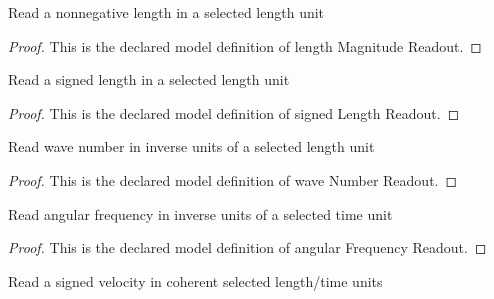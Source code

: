 \begin{definition}
  \label{def:physics:phyx-mini-0302:phyxminiproblems-problemphyxmini0302-lengthmagnitudereadout}
  Read a nonnegative length in a selected length unit
\end{definition}
\begin{proof}
  This is the declared model definition of length Magnitude Readout.
\end{proof}
\begin{definition}
  \label{def:physics:phyx-mini-0302:phyxminiproblems-problemphyxmini0302-signedlengthreadout}
  Read a signed length in a selected length unit
\end{definition}
\begin{proof}
  This is the declared model definition of signed Length Readout.
\end{proof}
\begin{definition}
  \label{def:physics:phyx-mini-0302:phyxminiproblems-problemphyxmini0302-wavenumberreadout}
  Read wave number in inverse units of a selected length unit
\end{definition}
\begin{proof}
  This is the declared model definition of wave Number Readout.
\end{proof}
\begin{definition}
  \label{def:physics:phyx-mini-0302:phyxminiproblems-problemphyxmini0302-angularfrequencyreadout}
  Read angular frequency in inverse units of a selected time unit
\end{definition}
\begin{proof}
  This is the declared model definition of angular Frequency Readout.
\end{proof}
\begin{definition}
  \label{def:physics:phyx-mini-0302:phyxminiproblems-problemphyxmini0302-signedvelocityreadout}
  Read a signed velocity in coherent selected length/time units
\end{definition}
